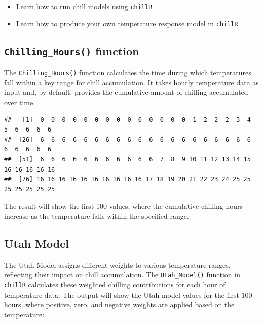 \documentclass[
]{article}
\newenvironment{Shaded}{\begin{snugshade}}{\end{snugshade}}
\newcommand{\DecValTok}[1]{\textcolor[rgb]{0.00,0.00,0.81}{#1}}
\newcommand{\FunctionTok}[1]{\textcolor[rgb]{0.13,0.29,0.53}{\textbf{#1}}}
\newcommand{\NormalTok}[1]{#1}
\newcommand{\SpecialCharTok}[1]{\textcolor[rgb]{0.81,0.36,0.00}{\textbf{#1}}}
\providecommand{\tightlist}{%
  \setlength{\itemsep}{0pt}\setlength{\parskip}{0pt}}
\begin{document}
\begin{itemize}
\tightlist
\item
  Learn how to run chill models using \texttt{chillR}
\item
  Learn how to produce your own temperature response model in \texttt{chillR}
\end{itemize}

\subsection{\texorpdfstring{\texttt{Chilling\_Hours()} function}{Chilling\_Hours() function}}\label{chilling_hours-function}

The \texttt{Chilling\_Hours()} function calculates the time during which temperatures fall within a key range for chill accumulation. It takes hourly temperature data as input and, by default, provides the cumulative amount of chilling accumulated over time.

\begin{Shaded}
\end{Shaded}

\begin{verbatim}
##   [1]  0  0  0  0  0  0  0  0  0  0  0  0  0  0  1  2  2  2  3  4  5  6  6  6  6
##  [26]  6  6  6  6  6  6  6  6  6  6  6  6  6  6  6  6  6  6  6  6  6  6  6  6  6
##  [51]  6  6  6  6  6  6  6  6  6  6  6  7  8  9 10 11 12 13 14 15 16 16 16 16 16
##  [76] 16 16 16 16 16 16 16 16 16 16 17 18 19 20 21 22 23 24 25 25 25 25 25 25 25
\end{verbatim}

The result will show the first 100 values, where the cumulative chilling hours increase as the temperature falls within the specified range.

\subsection{Utah Model}\label{utah-model}

The Utah Model assigns different weights to various temperature ranges, reflecting their impact on chill accumulation. The \texttt{Utah\_Model()} function in \texttt{chillR} calculates these weighted chilling contributions for each hour of temperature data. The output will show the Utah model values for the first 100 hours, where positive, zero, and negative weights are applied based on the temperature:
\end{document}
